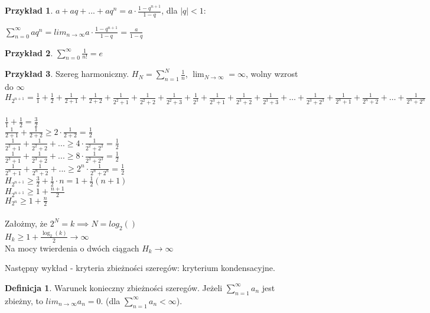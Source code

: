\documentclass{article}
\theoremstyle{definition}
\newtheorem{de}{Definicja}[subsection]
\theoremstyle{definition}
\theoremstyle{definition}
\newtheorem{pk}{Przykład}[subsection]
\theoremstyle{definition}
\begin{document}
\begin{pk}
    $a+aq+...+aq^n=a\cdot \frac{1-q^{n+1}}{1-q}$, dla $|q|<1$:
    \begin{center}
    $\sum_{n=0}^{\infty} aq^n = lim_{n\rightarrow \infty} a\cdot \frac{1-q^{n+1}}{1-q} = \frac{a}{1-q}$
    \end{center}
\end{pk}

\begin{pk}
    $\sum_{n=0}^{\infty} \frac{1}{n!} = e$
\end{pk}

\begin{pk}
Szereg harmoniczny.
$H_N = \sum_{n=1}^{N} \frac{1}{n}$, $\lim_{N\rightarrow \infty}=\infty$, wolny wzrost do $\infty$\\
$H_{2^{n+1}}=\frac{1}{1} + \frac{1}{2} + \frac{1}{2+1} + \frac{1}{2+2} + \frac{1}{2^2 + 1} + \frac{1}{2^2+2} + \frac{1}{2^2+3} + \frac{1}{2^3} + \frac{1}{2^3+1} + \frac{1}{2^3 + 2} + \frac{1}{2^3 + 3} + \dots + \frac{1}{2^3 + 2^3} + \frac{1}{2^n + 1} + \frac{1}{2^n + 2} + \dots + \frac{1}{2^n+2^n}$\\\\
$\frac{1}{1}+\frac{1}{2}=\frac{3}{2}$\\
$\frac{1}{2+1}+\frac{1}{2+2}\geq 2\cdot \frac{1}{2+2}=\frac{1}{2}$\\
$\frac{1}{2^2+1}+\frac{1}{2^2+2} + ... \geq 4\cdot \frac{1}{2^2 + 2^2}=\frac{1}{2}$\\
$\frac{1}{2^3+1}+\frac{1}{2^3+2} + ... \geq 8\cdot \frac{1}{2^3 + 2^3}=\frac{1}{2}$\\
$\frac{1}{2^n+1}+\frac{1}{2^n+2} + ... \geq 2^{n}\cdot \frac{1}{2^n + 2^n}=\frac{1}{2}$\\
$H_{2^{n+1}}\geq \frac{3}{2} + \frac{1}{2} \cdot n = 1 + \frac{1}{2} (n+1)$\\
$H_{2^{n+1}}\geq 1 + \frac{n+1}{2}$\\
$H_{2^n}\geq 1 + \frac{n}{2}$\\\\
Założmy, że $2^N=k \implies N=log_2()$\\
$H_{k}\geq 1 + \frac{\log_2(k)}{2} \rightarrow \infty$\\
Na mocy twierdenia o dwóch ciągach $H_k \rightarrow \infty$
\end{pk}

Następny wykład - kryteria zbieżności szeregów: kryterium kondensacyjne.

\begin{de}
    Warunek konieczny zbieżności szeregów. Jeżeli $\sum_{n=1}^{\infty} a_n$ jest zbieżny, to $lim_{n\rightarrow \infty} a_n = 0$. (dla $\sum_{n=1}^{\infty} a_n < \infty$).
\end{de}
\end{document}
